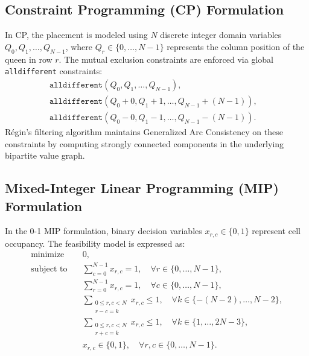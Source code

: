 \documentclass[a4paper,fleqn]{cas-sc}
\begin{document}
\subsection{Constraint Programming (CP) Formulation}
In CP, the placement is modeled using $N$ discrete integer domain variables $Q_0, Q_1, \dots, Q_{N-1}$, where $Q_r \in \{0, \dots, N-1\}$ represents the column position of the queen in row $r$. The mutual exclusion constraints are enforced via global \texttt{alldifferent} constraints:
\begin{align}
    \texttt{alldifferent}(Q_0, Q_1, \dots, Q_{N-1}), & \label{eq:cp_cols} \\
    \texttt{alldifferent}(Q_0 + 0, Q_1 + 1, \dots, Q_{N-1} + (N-1)), & \label{eq:cp_diag1} \\
    \texttt{alldifferent}(Q_0 - 0, Q_1 - 1, \dots, Q_{N-1} - (N-1)). & \label{eq:cp_diag2}
\end{align}
Régin's filtering algorithm \citep{regin1994filtering} maintains Generalized Arc Consistency on these constraints by computing strongly connected components in the underlying bipartite value graph.

\subsection{Mixed-Integer Linear Programming (MIP) Formulation}
In the 0-1 MIP formulation, binary decision variables $x_{r, c} \in \{0, 1\}$ represent cell occupancy. The feasibility model is expressed as:
\begin{align}
    \text{minimize} \quad & 0, \label{eq:mip_obj} \\
    \text{subject to} \quad & \sum_{c=0}^{N-1} x_{r, c} = 1, \quad \forall r \in \{0, \dots, N-1\}, \label{eq:mip_row} \\
    & \sum_{r=0}^{N-1} x_{r, c} = 1, \quad \forall c \in \{0, \dots, N-1\}, \label{eq:mip_col} \\
    & \sum_{\substack{0 \le r, c < N \\ r - c = k}} x_{r, c} \le 1, \quad \forall k \in \{-(N-2), \dots, N-2\}, \label{eq:mip_diag1} \\
    & \sum_{\substack{0 \le r, c < N \\ r + c = k}} x_{r, c} \le 1, \quad \forall k \in \{1, \dots, 2N-3\}, \label{eq:mip_diag2} \\
    & x_{r, c} \in \{0, 1\}, \quad \forall r, c \in \{0, \dots, N-1\}. \label{eq:mip_vars}
\end{align}
\end{document}
